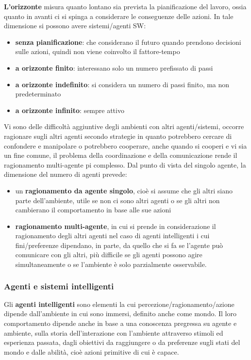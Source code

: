\documentclass[a4paper]{extarticle}
\begin{document}
\textbf{L'orizzonte} misura quanto lontano sia prevista la pianificazione del lavoro, ossia quanto in avanti ci si spinga a considerare le conseguenze delle azioni. In tale dimensione si possono avere sistemi/agenti SW:
\begin{itemize}
\item \textbf{senza pianificazione}: che considerano il futuro quando prendono decisioni sulle azioni, quindi non viene coinvolto il fattore-tempo
\item \textbf{a orizzonte finito}: interessano solo un numero prefissato di passi
\item \textbf{a orizzonte indefinito}: si considera un numero di passi finito, ma non predeterminato
\item \textbf{a orizzonte infinito}: sempre attivo
\end{itemize}

Vi sono delle difficoltà aggiuntive degli ambienti con altri agenti/sistemi, occorre ragionare sugli altri agenti secondo strategie in quanto potrebbero cercare di confondere e manipolare o potrebbero cooperare, anche quando si cooperi e vi sia un fine comune, il problema della coordinazione e della comunicazione rende il ragionamento multi-agente pi complesso. Dal punto di vista del singolo agente, la dimensione del numero di agenti prevede:
\begin{itemize}
\item un \textbf{ragionamento da agente singolo}, cioè si assume che gli altri siano parte dell'ambiente, utile se non ci sono altri agenti o se gli altri non cambierano il comportamento in base alle sue azioni
\item \textbf{ragionamento multi-agente}, in cui si prende in considerazione il ragionamento degli altri agenti nel caso di agenti intelligenti i cui fini/preferenze dipendano, in parte, da quello che si fa se l'agente può comunicare con gli altri, più difficile se gli agenti possono agire simultaneamente o se l'ambiente è solo parzialmente osservabile.
\end{itemize}

\subsubsection{Agenti e sistemi intelligenti}

Gli \textbf{agenti intelligenti} sono elementi la cui percezione/ragionamento/azione dipende dall'ambiente in cui sono immersi, definito anche come mondo. Il loro comportamento dipende anche in base a una conoscenza pregressa su agente e ambiente, sulla storia dell'interazione con l'ambiente attraverso stimoli ed esperienza passata, dagli obiettivi da raggiungere o da preferenze sugli stati del mondo e dalle abilità, cioè azioni primitive di cui è capace.
\end{document}
